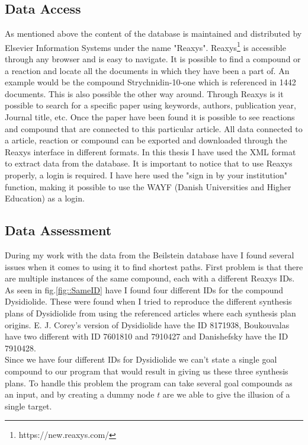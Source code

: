\documentclass[a4paper,10pt,titlepage]{paper}
\begin{document}
\subsection{Data Access}
As mentioned above the content of the database is maintained and distributed by Elsevier Information Systems under the name "Reaxys". Reaxys\footnote{https://new.reaxys.com/} is accessible through any browser and is easy to navigate. It is possible to find a compound or a reaction and locate all the documents in which they have been a part of. An example would be the compound Strychnidin-10-one which is referenced in 1442 documents. This is also possible the other way around. Through Reaxys is it possible to search for a specific paper using keywords, authors, publication year, Journal title, etc. Once the paper have been found it is possible to see reactions and compound that are connected to this particular article. All data connected to a article, reaction or compound can be exported and downloaded through the Reaxys interface in different formats. In this thesis I have used the XML format to extract data from the database. It is important to notice that to use Reaxys properly, a login is required. I have here used the "sign in by your institution" function, making it possible to use the WAYF (Danish Universities and Higher Education) as a login.
\subsection{Data Assessment}
\label{sec::Assesment}
During my work with the data from the Beilstein database have I found several issues when it comes to using it to find shortest paths.
First problem is that there are multiple instances of the same compound, each with a different Reaxys IDs. As seen in fig.\ref{fig::SameID} have I found four different IDs for the compound Dysidiolide. These were found when I tried to reproduce the different synthesis plans of Dysidiolide from \cite{SynthesisPlans} using the referenced articles where each synthesis plan origins. E. J. Corey's version of Dysidiolide have the ID 8171938, Boukouvalas have two different with ID 7601810 and 7910427 and Danishefsky have the ID 7910428. \\
Since we have four different IDs for Dysidiolide we can't state a single goal compound to our program that would result in giving us these three synthesis plans. To handle this problem the program can take several goal compounds as an input, and by creating a dummy node $t$ are we able to give the illusion of a single target.
\end{document}

